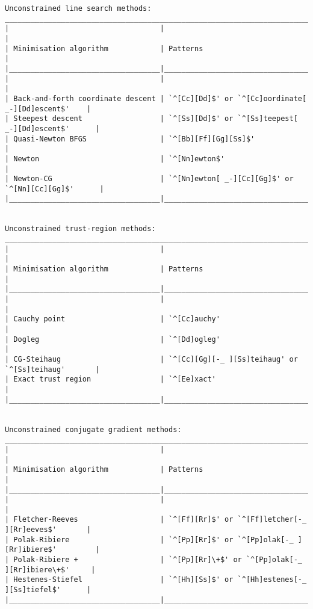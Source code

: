 {\begin{verbatim}
Unconstrained line search methods:
___________________________________________________________________________________________
|                                   |                                                     |
| Minimisation algorithm            | Patterns                                            |
|___________________________________|_____________________________________________________|
|                                   |                                                     |
| Back-and-forth coordinate descent | `^[Cc][Dd]$' or `^[Cc]oordinate[ _-][Dd]escent$'    |
| Steepest descent                  | `^[Ss][Dd]$' or `^[Ss]teepest[ _-][Dd]escent$'      |
| Quasi-Newton BFGS                 | `^[Bb][Ff][Gg][Ss]$'                                |
| Newton                            | `^[Nn]ewton$'                                       |
| Newton-CG                         | `^[Nn]ewton[ _-][Cc][Gg]$' or `^[Nn][Cc][Gg]$'      |
|___________________________________|_____________________________________________________|


Unconstrained trust-region methods:
___________________________________________________________________________________________
|                                   |                                                     |
| Minimisation algorithm            | Patterns                                            |
|___________________________________|_____________________________________________________|
|                                   |                                                     |
| Cauchy point                      | `^[Cc]auchy'                                        |
| Dogleg                            | `^[Dd]ogleg'                                        |
| CG-Steihaug                       | `^[Cc][Gg][-_ ][Ss]teihaug' or `^[Ss]teihaug'       |
| Exact trust region                | `^[Ee]xact'                                         |
|___________________________________|_____________________________________________________|


Unconstrained conjugate gradient methods:
___________________________________________________________________________________________
|                                   |                                                     |
| Minimisation algorithm            | Patterns                                            |
|___________________________________|_____________________________________________________|
|                                   |                                                     |
| Fletcher-Reeves                   | `^[Ff][Rr]$' or `^[Ff]letcher[-_ ][Rr]eeves$'       |
| Polak-Ribiere                     | `^[Pp][Rr]$' or `^[Pp]olak[-_ ][Rr]ibiere$'         |
| Polak-Ribiere +                   | `^[Pp][Rr]\+$' or `^[Pp]olak[-_ ][Rr]ibiere\+$'     |
| Hestenes-Stiefel                  | `^[Hh][Ss]$' or `^[Hh]estenes[-_ ][Ss]tiefel$'      |
|___________________________________|_____________________________________________________|



\end{verbatim}}
